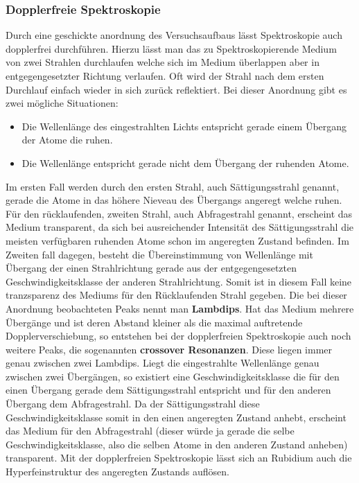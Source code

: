 \documentclass[12pt]{article}
\begin{document}
\subsubsection{Dopplerfreie Spektroskopie}
Durch eine geschickte anordnung des Versuchsaufbaus lässt Spektroskopie auch dopplerfrei durchführen.
Hierzu lässt man das zu Spektroskopierende Medium von zwei Strahlen durchlaufen welche sich im Medium überlappen aber in entgegengesetzter Richtung verlaufen. Oft wird der Strahl nach dem ersten Durchlauf einfach wieder in sich zurück reflektiert. Bei dieser Anordnung gibt es zwei mögliche Situationen:
\begin{itemize}
 \item Die Wellenlänge des eingestrahlten Lichts entspricht gerade einem Übergang der Atome die ruhen.
 \item Die Wellenlänge entspricht gerade nicht dem Übergang der ruhenden Atome.
\end{itemize}
Im ersten Fall werden durch den ersten Strahl, auch Sättigungsstrahl genannt, gerade die Atome in das höhere Nieveau des Übergangs angeregt welche ruhen. Für den rücklaufenden, zweiten Strahl, auch Abfragestrahl genannt, erscheint das Medium transparent, da sich bei ausreichender Intensität des Sättigungsstrahl die meisten verfügbaren ruhenden Atome schon im angeregten Zustand befinden. Im Zweiten fall dagegen, besteht die Übereinstimmung von Wellenlänge mit Übergang der einen Strahlrichtung gerade aus der entgegengesetzten Geschwindigkeitsklasse der anderen Strahlrichtung. Somit ist in diesem Fall keine tranzsparenz des Mediums für den Rücklaufenden Strahl gegeben. Die bei dieser Anordnung beobachteten Peaks nennt man \textbf{Lambdips}. Hat das Medium mehrere Übergänge und ist deren Abstand kleiner als die maximal auftretende Dopplerverschiebung, so entstehen bei der dopplerfreien Spektroskopie auch noch weitere Peaks, die sogenannten \textbf{crossover Resonanzen}. Diese liegen immer genau zwischen zwei Lambdips. Liegt die eingestrahlte Wellenlänge genau zwischen zwei Übergängen, so existiert eine Geschwindigkeitsklasse die für den einen Übergang gerade dem Sättigungsstrahl entspricht und für den anderen Übergang dem Abfragestrahl. Da der Sättigungsstrahl diese Geschwindigkeitsklasse somit in den einen angeregten Zustand anhebt, erscheint das Medium für den Abfragestrahl (dieser würde ja gerade die selbe Geschwindigkeitsklasse, also die selben Atome in den anderen Zustand anheben) transparent. Mit der dopplerfreien Spektroskopie lässt sich an Rubidium auch die Hyperfeinstruktur des angeregten Zustands auflösen.
\end{document}
